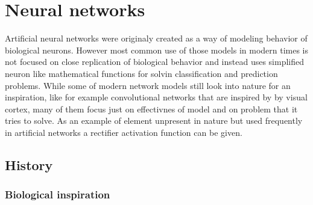 \chapter{Neural networks}
Artificial neural networks were originaly created as a way of modeling behavior of biological
neurons. However most common use of those models in modern times is not focused on close
replication of biological behavior and instead uses simplified neuron like mathematical 
functions for solvin classification and prediction problems.
While some of modern network models still look into nature for an inspiration, like for example
convolutional networks that are inspired by by visual cortex, many of them focus just on 
effectivnes of model and on problem that it tries to solve.
As an example of element unpresent in nature but used frequently in artificial networks a 
rectifier activation function can be given.

\section{History}

\subsection{Biological inspiration}

